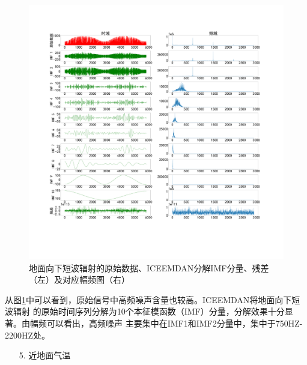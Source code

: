 \documentclass[AutoFakeBold]{LZUThesis}
\begin{document}
\begin{figure}[H]
	\centering
    \includegraphics[width=1\textwidth]{figures/srad.pdf}
    \caption{地面向下短波辐射的原始数据、ICEEMDAN分解IMF分量、残差（左）及对应幅频图（右）}
    \label{fig_srad}
\end{figure}

从图\ref{fig_srad}中可以看到，原始信号中高频噪声含量也较高。ICEEMDAN将地面向下短波辐射
的原始时间序列分解为10个本征模函数（IMF）分量，分解效果十分显著。由幅频可以看出，高频噪声
主要集中在IMF1和IMF2分量中，集中于750HZ-2200HZ处。

\begin{itemize}
    \item[5. ] 近地面气温
\end{itemize}
\end{document}
